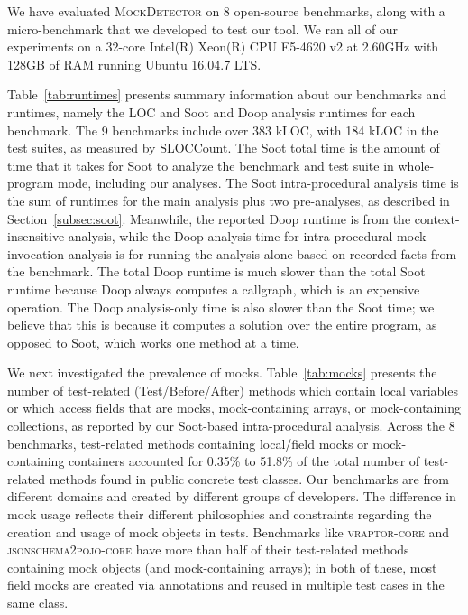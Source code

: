 
We have evaluated \textsc{MockDetector} on 8 open-source benchmarks, along with a micro-benchmark that we developed to test our tool. We ran all of our experiments on a 32-core Intel(R) Xeon(R) CPU E5-4620 v2 at 2.60GHz with 128GB of RAM running Ubuntu 16.04.7 LTS.

Table~\ref{tab:runtimes} presents summary information about our benchmarks and runtimes, namely the LOC and Soot and Doop analysis runtimes for each benchmark. The 9 benchmarks include over 383 kLOC, with 184 kLOC in the test suites, as measured by SLOCCount. The Soot total time is the amount of time that it takes for Soot to analyze the benchmark and test suite in whole-program mode, including our analyses. The Soot intra-procedural analysis time is the sum of runtimes for the main analysis plus two pre-analyses, as described in Section~\ref{subsec:soot}. Meanwhile, the reported Doop runtime is from the context-insensitive analysis, while the Doop analysis time for intra-procedural mock invocation analysis is for running the analysis alone based on recorded facts from the benchmark. The total Doop runtime is much slower than the total Soot runtime because Doop always computes a callgraph, which is an expensive operation. The Doop analysis-only time is also slower than the Soot time; we believe that this is because it computes a solution over the entire program, as opposed to Soot, which works one method at a time.

We next investigated the prevalence of mocks. Table~\ref{tab:mocks} presents the number of test-related (Test/Before/After) methods which contain local variables or which access fields that are mocks, mock-containing arrays, or mock-containing collections, as reported by our Soot-based intra-procedural analysis. Across the 8 benchmarks, test-related methods containing local/field mocks or mock-containing containers accounted for 0.35\% to 51.8\% of the total number of test-related methods found in public concrete test classes. Our benchmarks are from different domains and created by different groups of developers. The difference in mock usage reflects their different philosophies and constraints regarding the creation and usage of mock objects in tests. Benchmarks like \textsc{vraptor-core} and \textsc{jsonschema2pojo-core} have more than half of their test-related methods containing mock objects (and mock-containing arrays); in both of these, most field mocks are created via annotations and reused in multiple test cases in the same class.

